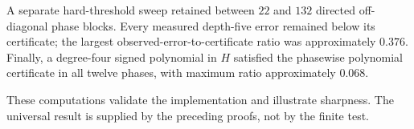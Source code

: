 A separate hard-threshold sweep retained between $22$ and $132$ directed
off-diagonal phase blocks.  Every measured depth-five error remained below its
certificate; the largest observed-error-to-certificate ratio was approximately
$0.376$.  Finally, a degree-four signed polynomial in $H$ satisfied the
phasewise polynomial certificate in all twelve phases, with maximum ratio
approximately $0.068$.

These computations validate the implementation and illustrate sharpness.  The
universal result is supplied by the preceding proofs, not by the finite test.
